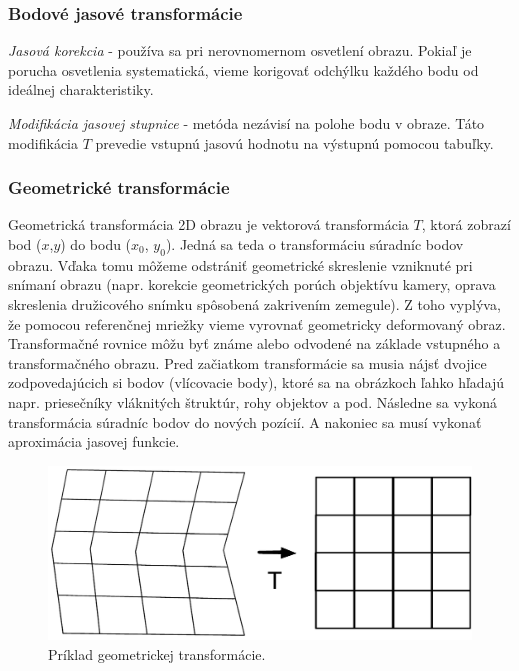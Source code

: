 \subsubsection{Bodové jasové transformácie}

\textit{Jasová korekcia} - používa sa pri nerovnomernom osvetlení obrazu. Pokiaľ je porucha
osvetlenia systematická, vieme korigovať odchýlku každého bodu od ideálnej charakteristiky. \cite{pocitacove_videnie_v_praxi}

\textit{Modifikácia jasovej stupnice} - metóda nezávisí na polohe bodu v obraze. Táto modifikácia $T$ prevedie vstupnú jasovú hodnotu na výstupnú pomocou tabuľky. \cite{pocitacove_videnie_v_praxi}


\subsubsection{Geometrické transformácie}
Geometrická transformácia 2D obrazu je vektorová transformácia $T$, ktorá zobrazí bod ($x$,$y$) do bodu ($x_0$, $y_0$). Jedná sa teda o transformáciu súradníc bodov obrazu. Vďaka tomu môžeme odstrániť geometrické skreslenie vzniknuté pri snímaní obrazu (napr. korekcie geometrických porúch objektívu kamery, oprava skreslenia družicového snímku spôsobená zakrivením zemegule). Z toho vyplýva, že pomocou referenčnej mriežky vieme vyrovnať geometricky deformovaný obraz. Transformačné rovnice môžu byť známe alebo odvodené na základe vstupného a transformačného obrazu. Pred začiatkom transformácie sa musia nájsť dvojice zodpovedajúcich si bodov (vlícovacie body), ktoré sa na obrázkoch ľahko hľadajú napr. priesečníky vláknitých štruktúr, rohy objektov a pod. Následne sa vykoná transformácia súradníc bodov do nových pozícií. A nakoniec sa musí vykonať aproximácia jasovej funkcie. \cite{Algorithms_and_Applications}

\begin{figure}[H]
\begin{center}
	\includegraphics[scale=0.4]{images/transform}
	\caption{Príklad geometrickej transformácie.}
	\end{center}
\end{figure}


